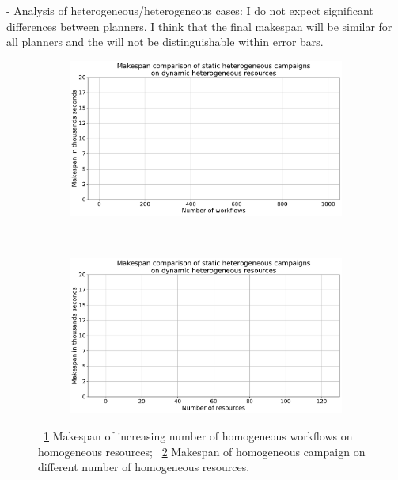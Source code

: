 - Analysis of heterogeneous/heterogeneous cases:
I do not expect significant differences between planners.
I think that the final makespan will be similar for all planners and the will not be distinguishable within error bars.
\begin{figure}[ht!]
    \centering
    \begin{subfigure}[b]{0.45\textwidth}
        \includegraphics[width=.95\textwidth]{figures/campaign/StHeteroCampaigns_4DyHeteroResources.pdf}
        \caption{}
        \label{fig:StHeteroCampaigns_4DyHeteroResources}
    \end{subfigure}%
    ~ 
    \begin{subfigure}[b]{0.45\textwidth}
        \includegraphics[width=\linewidth]{figures/campaign/DyHeteroResources_StHeteroCampaigns.pdf}
        \caption{}
        \label{fig:DyHeteroResources_StHeteroCampaigns}
    \end{subfigure}
    \caption{~\ref{fig:StHeteroCampaigns_4DyHeteroResources} Makespan of increasing number of homogeneous workflows on homogeneous resources;
    ~\ref{fig:DyHeteroResources_StHeteroCampaigns} Makespan of homogeneous campaign on different number of homogeneous resources.}
    \label{fig:no_replan_hetero_analysis}
\end{figure}


